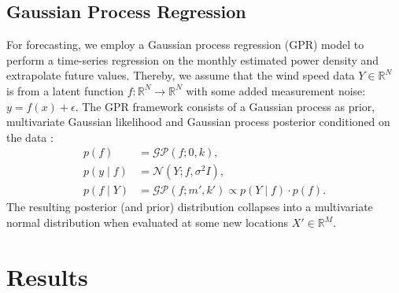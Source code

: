 \documentclass{article}
\theoremstyle{plain}
\theoremstyle{definition}
\theoremstyle{remark}
\begin{document}
\subsection{Gaussian Process Regression}\label{sec:gp}
For forecasting, we employ a Gaussian process regression (GPR) model to perform a time-series regression on the monthly estimated power density and extrapolate future values. Thereby, we assume that the wind speed data $Y \in \mathbb{R}^N$ is from a latent function $f: \mathbb{R}^N \rightarrow \mathbb{R}^N$ with some added measurement noise: $y = f(x) + \epsilon$. The GPR framework consists of a Gaussian process as prior, multivariate Gaussian likelihood and Gaussian process posterior conditioned on the data 
\cite{rasmussen-williams-gp}:
\begin{align}
    \label{eq:gp_prior}
    p(f) &= \mathcal{GP}(f; 0, k), \\
    \label{eq:gp_likelihood}
    p(y \mid f) &= \mathcal{N}(Y; f, \sigma^2 I), \\
    \label{eq:gp_posterior}
    p(f \mid Y) &= \mathcal{GP}(f; m', k') \propto p(Y \mid f) \cdot p(f).
\end{align}
The resulting posterior (and prior) distribution collapses into a multivariate normal distribution when evaluated at some new locations $X' \in \mathbb{R}^M$.

\section{Results}\label{sec:results}
\end{document}
